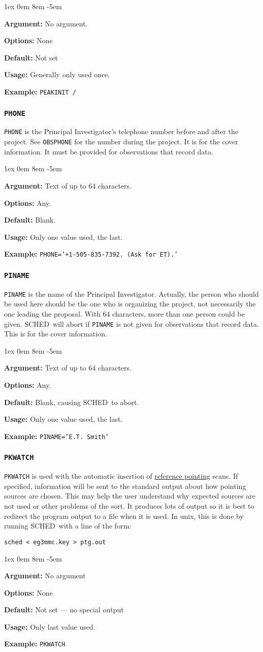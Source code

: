 \documentclass{report}
\newcommand{\schedb}{{\sc SCHED~}}
\newcommand{\rcwbox}[5]{
  \begin{list}{}{\parsep 1ex  \itemsep 0em
                 \leftmargin 8em  \itemindent -5em }
    \item {\bf Argument:} #1
    \item {\bf Options:}  #2
    \item {\bf Default:}  #3
    \item {\bf Usage:}    #4
    \item {\bf Example:}  #5
  \end{list}
}
\begin{document}
\rcwbox
{No argument.}
{None}
{Not set}
{Generally only used once.}
{{\tt PEAKINIT /}}


\subsubsection{\label{MP:PHONE}{\tt PHONE}}

{\tt PHONE} is the  Principal Investigator's telephone number before
and after the project. See {\tt OBSPHONE} for the number during the
project.  It is for the cover information.  It must be provided for
observations that record data.

\rcwbox
{Text of up to 64 characters.}
{Any.}
{Blank.}
{Only one value used, the last.}
{{\tt PHONE='+1-505-835-7392. (Ask for ET).'}}


\subsubsection{\label{MP:PINAME}{\tt PINAME}}

{\tt PINAME} is the name of the Principal Investigator.  Actually,
the person who should be used here should be the one who is organizing
the project, not necessarily the one leading the proposal.  With 64
characters, more than one person could be given. \schedb will
abort if {\tt PINAME} is not given for observations that record data.
This is for the cover information.

\rcwbox
{Text of up to 64 characters.}
{Any.}
{Blank, causing \schedb to abort.}
{Only one value used, the last.}
{{\tt PINAME='E.T. Smith'}}


\subsubsection{\label{MP:PKWATCH}{\tt PKWATCH}}

{\tt PKWATCH} is used with the automatic insertion of 
{\hyperref[SEC:REFPOINT]{reference pointing}} scans.
If specified, information will be sent
to the standard output about how pointing sources are chosen.  This
may help the user understand why expected sources are not used or
other problems of the sort.  It produces lots of output so it is best
to redirect the program output to a file when it is used.  In unix, this
is done by running \schedb with a line of the form:

{\tt sched < eg3mmc.key > ptg.out}

\rcwbox
{No argument}
{None}
{Not set --- no special output}
{Only last value used.}
{{\tt PKWATCH}}
\end{document}
